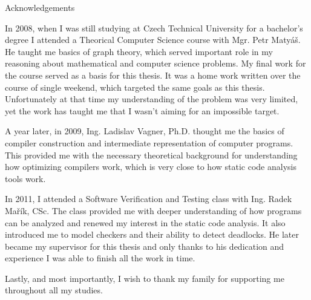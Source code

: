 \cleardoublepage
\vspace*{\fill}
\noindent
{\huge {%
Acknowledgements%
}}
\vspace{3ex}\par

In 2008, when I was still studying at Czech Technical University for a bachelor's degree I attended a Theorical Computer Science course with Mgr. Petr Matyáš. He taught me basics of graph theory, which served important role in my reasoning about mathematical and computer science problems. My final work for the course served as a basis for this thesis. It was a home work written over the course of single weekend, which targeted the same goals as this thesis. Unfortunately at that time my understanding of the problem was very limited, yet the work has taught me that I wasn't aiming for an impossible target.

A year later, in 2009, Ing. Ladislav Vagner, Ph.D. thought me the basics of compiler construction and intermediate representation of computer programs. This provided me with the necessary theoretical background for understanding how optimizing compilers work, which is very close to how static code analysis tools work.

In 2011, I attended a Software Verification and Testing class with Ing. Radek Mařík, CSc. The class provided me with deeper understanding of how programs can be analyzed and renewed my interest in the static code analysis. It also introduced me to model checkers and their ability to detect deadlocks. He later became my supervisor for this thesis and only thanks to his dedication and experience I was able to finish all the work in time.

Lastly, and most importantly, I wish to thank my family for supporting me throughout all my studies.